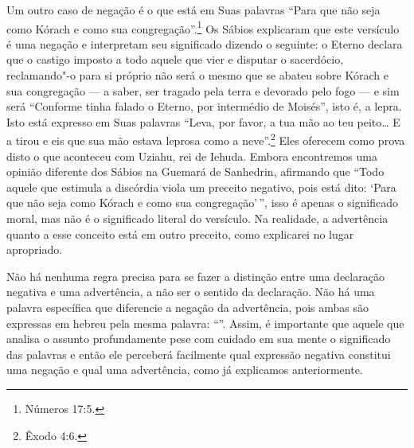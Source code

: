 Um outro caso de negação é o que está em Suas palavras ``Para que não
seja como Kórach\starr{} e como sua congregação''.\footnote{Números 17:5.} Os Sábios
explicaram que este versículo é uma negação e interpretam seu
significado dizendo o seguinte: o Eterno declara que o castigo imposto
a todo aquele que vier e disputar o sacerdócio, reclamando"-o para si
próprio não será o mesmo que se abateu sobre Kórach\starr{} e sua congregação ---
a saber, ser tragado pela terra e devorado pelo fogo --- e sim será
``Conforme tinha falado o Eterno, por intermédio de Moisés'', isto é, a
lepra. Isto está expresso em Suas palavras ``Leva, por favor, a tua mão
ao teu peito\ldots{} E a tirou e eis que sua mão estava leprosa como a neve''.\footnote{Êxodo 4:6.} Eles oferecem como prova disto o que aconteceu com Uziahu\starr,
rei de Iehuda\starr. Embora encontremos uma opinião diferente dos Sábios na
Guemará\starr{} de Sanhedrin\starr, afirmando que ``Todo aquele que estimula a
discórdia viola um preceito negativo, pois está dito: `Para que não seja
como Kórach\starr{} e como sua congregação'\,'', isso é apenas o significado moral,
mas não é o significado literal do versículo. Na realidade, a
advertência quanto a esse conceito está em outro preceito, como
explicarei no lugar apropriado.

Não há nenhuma regra precisa para se fazer a distinção entre uma
declaração negativa e uma advertência, a não ser o sentido da
declaração. Não há uma palavra específica que diferencie a negação da
advertência, pois ambas são expressas em hebreu pela mesma palavra:
``''. Assim, é importante que aquele que analisa o assunto
profundamente pese com cuidado em sua mente o significado das palavras e
então ele perceberá facilmente qual expressão negativa constitui uma
negação e qual uma advertência, como já explicamos anteriormente.

